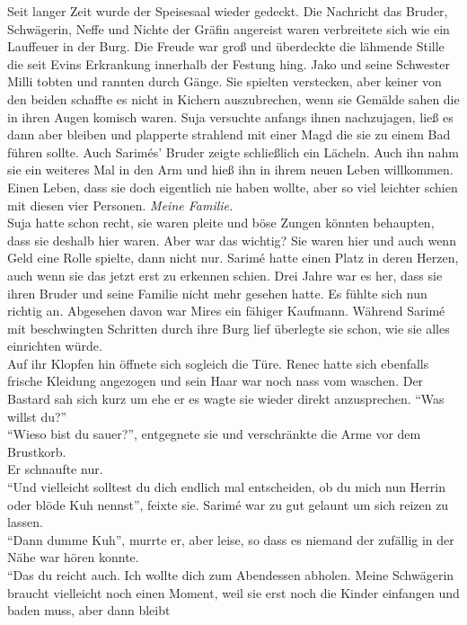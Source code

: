 Seit langer Zeit wurde der Speisesaal wieder gedeckt. Die Nachricht das Bruder, Schwägerin, Neffe 
und Nichte der Gräfin angereist waren verbreitete sich wie ein Lauffeuer in der Burg. Die Freude 
war groß und überdeckte die lähmende Stille die seit Evins Erkrankung innerhalb der Festung hing. 
Jako und seine Schwester Milli tobten und rannten durch Gänge. Sie spielten verstecken, aber keiner 
von den beiden schaffte es nicht in Kichern auszubrechen, wenn sie Gemälde sahen die in ihren Augen 
komisch waren. Suja versuchte anfangs ihnen nachzujagen, ließ es dann aber bleiben und plapperte 
strahlend mit einer Magd die sie zu einem Bad führen sollte. Auch Sarimés' Bruder zeigte 
schließlich ein Lächeln. Auch ihn nahm sie ein weiteres Mal in den Arm und hieß ihn in ihrem neuen 
Leben willkommen. Einen Leben, dass sie doch eigentlich nie haben wollte, aber so viel leichter 
schien mit diesen vier Personen. \textit{Meine Familie.}\\
Suja hatte schon recht, sie waren pleite und böse Zungen könnten behaupten, dass sie deshalb hier 
waren. Aber war das wichtig? Sie waren hier und auch wenn Geld eine Rolle spielte, dann nicht nur. 
Sarimé hatte einen Platz in deren Herzen, auch wenn sie das jetzt erst zu erkennen schien. Drei 
Jahre war es her, dass sie ihren Bruder und seine Familie nicht mehr gesehen hatte. Es fühlte sich 
nun richtig an. Abgesehen davon war Mires ein fähiger Kaufmann. Während Sarimé mit beschwingten 
Schritten durch ihre Burg lief überlegte sie schon, wie sie alles einrichten würde.\\
Auf ihr Klopfen hin öffnete sich sogleich die Türe. Renec hatte sich ebenfalls frische Kleidung 
angezogen und sein Haar war noch nass vom waschen. Der Bastard sah sich kurz um ehe er es wagte sie 
wieder direkt anzusprechen. ``Was willst du?''\\
``Wieso bist du sauer?'', entgegnete sie und verschränkte die Arme vor dem Brustkorb. \\
Er schnaufte nur.\\
``Und vielleicht solltest du dich endlich mal entscheiden, ob du mich nun Herrin oder blöde Kuh 
nennst'', feixte sie. Sarimé war zu gut gelaunt um sich reizen zu lassen. \\
``Dann dumme Kuh'', murrte er, aber leise, so dass es niemand der zufällig in der Nähe war hören 
konnte.\\
``Das du reicht auch. Ich wollte dich zum Abendessen abholen. Meine Schwägerin braucht vielleicht 
noch einen Moment, weil sie erst noch die Kinder einfangen und baden muss, aber dann bleibt 
